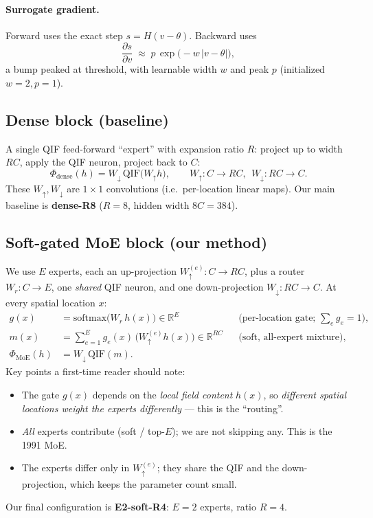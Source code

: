 \documentclass[11pt]{article}
\begin{document}
\paragraph{Surrogate gradient.} Forward uses the exact step $s=H(v-\theta)$. Backward uses
\begin{equation}
\frac{\partial s}{\partial v} \;\approx\; p\,\exp\!\big(-w\,|v-\theta|\big),
\end{equation}
a bump peaked at threshold, with learnable width $w$ and peak $p$ (initialized $w{=}2,p{=}1$).

\subsection{Dense block (baseline)}
A single QIF feed-forward ``expert'' with expansion ratio $R$: project up to width $RC$, apply the
QIF neuron, project back to $C$:
\begin{equation}
\Phi_{\mathrm{dense}}(h) = W_{\downarrow}\,\mathrm{QIF}\!\big(W_{\uparrow}h\big),\qquad
W_{\uparrow}\!:\!C\!\to\!RC,\ \ W_{\downarrow}\!:\!RC\!\to\!C.
\end{equation}
These $W_\uparrow, W_\downarrow$ are $1{\times}1$ convolutions (i.e.\ per-location linear maps). Our
main baseline is \textbf{dense-R8} ($R{=}8$, hidden width $8C{=}384$).

\subsection{Soft-gated MoE block (our method)}
We use $E$ experts, each an up-projection $W_\uparrow^{(e)}\!:\!C\!\to\!RC$, plus a router
$W_r\!:\!C\!\to\!E$, one \emph{shared} QIF neuron, and one down-projection $W_\downarrow\!:\!RC\!\to\!C$.
At every spatial location $x$:
\begin{align}
g(x) &= \mathrm{softmax}\!\big(W_r\,h(x)\big) \in \mathbb{R}^{E}
      &&\text{(per-location gate; $\textstyle\sum_e g_e=1$),}\\
m(x) &= \sum_{e=1}^{E} g_e(x)\,\big(W_\uparrow^{(e)} h(x)\big) \in \mathbb{R}^{RC}
      &&\text{(soft, all-expert mixture),}\\
\Phi_{\mathrm{MoE}}(h) &= W_\downarrow\,\mathrm{QIF}(m).
\end{align}
Key points a first-time reader should note:
\begin{itemize}[leftmargin=*,itemsep=1pt]
\item The gate $g(x)$ depends on the \emph{local field content} $h(x)$, so \emph{different spatial
      locations weight the experts differently} --- this is the ``routing''.
\item \emph{All} experts contribute (soft / top-$E$); we are not skipping any. This is the 1991 MoE.
\item The experts differ only in $W_\uparrow^{(e)}$; they share the QIF and the down-projection, which
      keeps the parameter count small.
\end{itemize}
Our final configuration is \textbf{E2-soft-R4}: $E{=}2$ experts, ratio $R{=}4$.
\end{document}
